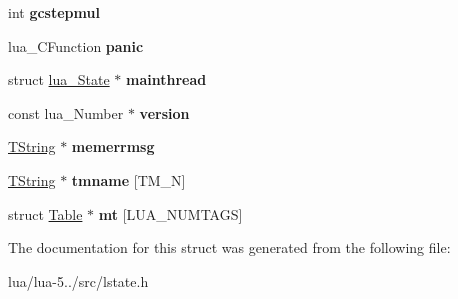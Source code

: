 \begin{DoxyCompactItemize}
\item 
\hypertarget{structglobal___state_acd2271d481c60fa86f30577f88227e1e}{int {\bfseries gcstepmul}}\label{structglobal___state_acd2271d481c60fa86f30577f88227e1e}

\item 
\hypertarget{structglobal___state_aa925f5bcdedf55e5353e37cfe9e5d6d0}{lua\+\_\+\+C\+Function {\bfseries panic}}\label{structglobal___state_aa925f5bcdedf55e5353e37cfe9e5d6d0}

\item 
\hypertarget{structglobal___state_a2c81856ac69a92580d4330cd1070c7c5}{struct \hyperlink{structlua___state}{lua\+\_\+\+State} $\ast$ {\bfseries mainthread}}\label{structglobal___state_a2c81856ac69a92580d4330cd1070c7c5}

\item 
\hypertarget{structglobal___state_a7c5abd011a64e4d6414550eda1776e86}{const lua\+\_\+\+Number $\ast$ {\bfseries version}}\label{structglobal___state_a7c5abd011a64e4d6414550eda1776e86}

\item 
\hypertarget{structglobal___state_a713375c43bd8b0b3016a97f173ce6992}{\hyperlink{union_t_string}{T\+String} $\ast$ {\bfseries memerrmsg}}\label{structglobal___state_a713375c43bd8b0b3016a97f173ce6992}

\item 
\hypertarget{structglobal___state_ac1d80bd5bb3d4427b25054696eb1542c}{\hyperlink{union_t_string}{T\+String} $\ast$ {\bfseries tmname} \mbox{[}T\+M\+\_\+\+N\mbox{]}}\label{structglobal___state_ac1d80bd5bb3d4427b25054696eb1542c}

\item 
\hypertarget{structglobal___state_afedc8eb51bcf9d250bac26862e4127d5}{struct \hyperlink{struct_table}{Table} $\ast$ {\bfseries mt} \mbox{[}L\+U\+A\+\_\+\+N\+U\+M\+T\+A\+G\+S\mbox{]}}\label{structglobal___state_afedc8eb51bcf9d250bac26862e4127d5}

\end{DoxyCompactItemize}


The documentation for this struct was generated from the following file\+:\begin{DoxyCompactItemize}
\item 
lua/lua-\/5../src/lstate.\+h\end{DoxyCompactItemize}
